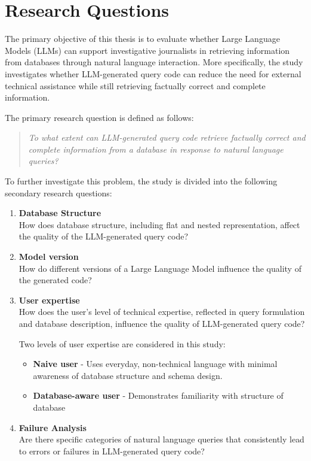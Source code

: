 \section{Research Questions}

The primary objective of this thesis is to evaluate whether Large Language Models (LLMs) can support investigative journalists in retrieving information from databases through natural language interaction. More specifically, the study investigates whether LLM-generated query code can reduce the need for external technical assistance while still retrieving factually correct and complete information.

The primary research question is defined as follows:

\begin{quote}
    \textit{To what extent can LLM-generated query code retrieve factually correct and complete information from a database in response to natural language queries?}
\end{quote}

To further investigate this problem, the study is divided into the following secondary research questions:

\begin{enumerate}
    \item \textbf{Database Structure} \\
    How does database structure, including flat and nested representation, affect the quality of the LLM-generated query code?

    \item \textbf{Model version} \\
    How do different versions of a Large Language Model influence the quality of the generated code?

    \item \textbf{User expertise} \\
    How does the user's level of technical expertise, reflected in query formulation and database description, influence the quality of LLM-generated query code?

    Two levels of user expertise are considered in this study:

\begin{itemize}
    \item \textbf{Naive user} - Uses everyday, non-technical language with minimal awareness of database structure and schema design. 

    \item \textbf{Database-aware user} - Demonstrates familiarity with structure of database
\end{itemize}

    \item \textbf{Failure Analysis} \\
    Are there specific categories of natural language queries that consistently lead to errors or failures in LLM-generated query code?
\end{enumerate}



